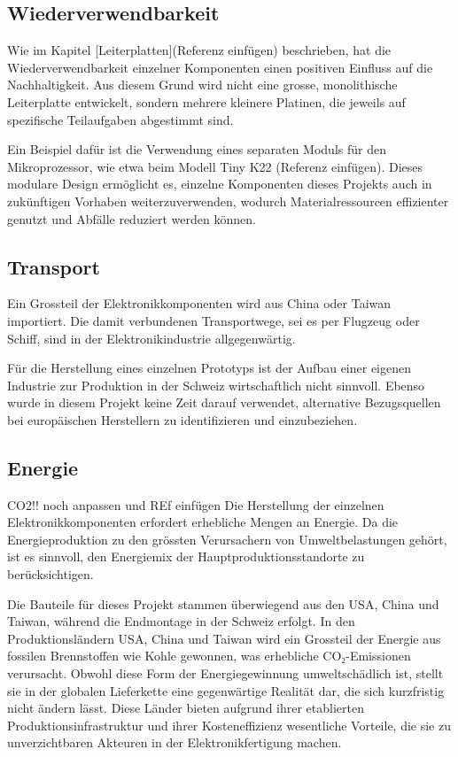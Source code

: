 \subsection{Wiederverwendbarkeit}

Wie im Kapitel [Leiterplatten](Referenz einfügen) beschrieben, hat die Wiederverwendbarkeit einzelner Komponenten einen positiven Einfluss auf die Nachhaltigkeit. Aus diesem Grund wird nicht eine grosse, monolithische Leiterplatte entwickelt, sondern mehrere kleinere Platinen, die jeweils auf spezifische Teilaufgaben abgestimmt sind.

Ein Beispiel dafür ist die Verwendung eines separaten Moduls für den Mikroprozessor, wie etwa beim Modell Tiny K22 (Referenz einfügen). Dieses modulare Design ermöglicht es, einzelne Komponenten dieses Projekts auch in zukünftigen Vorhaben weiterzuverwenden, wodurch Materialressourcen effizienter genutzt und Abfälle reduziert werden können.

\subsection{Transport}

Ein Grossteil der Elektronikkomponenten wird aus China oder Taiwan importiert. Die damit verbundenen Transportwege, sei es per Flugzeug oder Schiff, sind in der Elektronikindustrie allgegenwärtig.

Für die Herstellung eines einzelnen Prototyps ist der Aufbau einer eigenen Industrie zur Produktion in der Schweiz wirtschaftlich nicht sinnvoll. Ebenso wurde in diesem Projekt keine Zeit darauf verwendet, alternative Bezugsquellen bei europäischen Herstellern zu identifizieren und einzubeziehen.

\subsection{Energie}
CO2!! noch anpassen und REf einfügen
Die Herstellung der einzelnen Elektronikkomponenten erfordert erhebliche Mengen an Energie. Da die Energieproduktion zu den grössten Verursachern von Umweltbelastungen gehört, ist es sinnvoll, den Energiemix der Hauptproduktionsstandorte zu berücksichtigen.

Die Bauteile für dieses Projekt stammen überwiegend aus den USA, China und Taiwan, während die Endmontage in der Schweiz erfolgt. In den Produktionsländern USA, China und Taiwan wird ein Grossteil der Energie aus fossilen Brennstoffen wie Kohle gewonnen, was erhebliche CO₂-Emissionen verursacht. Obwohl diese Form der Energiegewinnung umweltschädlich ist, stellt sie in der globalen Lieferkette eine gegenwärtige Realität dar, die sich kurzfristig nicht ändern lässt. Diese Länder bieten aufgrund ihrer etablierten Produktionsinfrastruktur und ihrer Kosteneffizienz wesentliche Vorteile, die sie zu unverzichtbaren Akteuren in der Elektronikfertigung machen.

